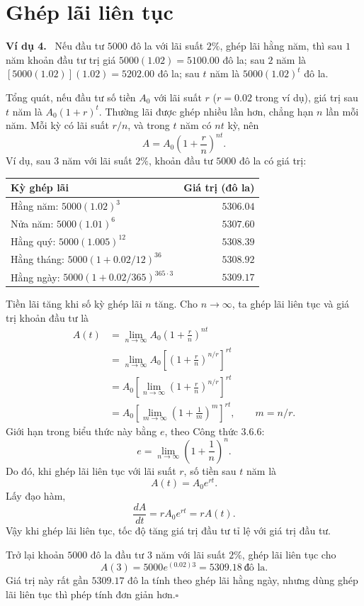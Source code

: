 \documentclass[12pt,a4paper]{article}
\newcommand{\ex}[1]{\par\medskip\noindent\textbf{Ví dụ #1.}\ }
\begin{document}
\section*{Ghép lãi liên tục}
\ex{4} Nếu đầu tư $5000$ đô la với lãi suất $2\%$, ghép lãi hằng năm, thì sau $1$ năm khoản đầu tư trị giá $5000(1.02)=5100.00$ đô la; sau $2$ năm là $[5000(1.02)](1.02)=5202.00$ đô la; sau $t$ năm là $5000(1.02)^t$ đô la.

Tổng quát, nếu đầu tư số tiền $A_0$ với lãi suất $r$ ($r=0.02$ trong ví dụ), giá trị sau $t$ năm là $A_0(1+r)^t$. Thường lãi được ghép nhiều lần hơn, chẳng hạn $n$ lần mỗi năm. Mỗi kỳ có lãi suất $r/n$, và trong $t$ năm có $nt$ kỳ, nên
\[A=A_0\left(1+\frac rn\right)^{nt}.\]
Ví dụ, sau $3$ năm với lãi suất $2\%$, khoản đầu tư $5000$ đô la có giá trị:
\begin{center}\begin{tabular}{lr}\toprule
Kỳ ghép lãi & Giá trị (đô la)\\\midrule
Hằng năm: $5000(1.02)^3$ & $5306.04$\\
Nửa năm: $5000(1.01)^6$ & $5307.60$\\
Hằng quý: $5000(1.005)^{12}$ & $5308.39$\\
Hằng tháng: $5000(1+0.02/12)^{36}$ & $5308.92$\\
Hằng ngày: $5000(1+0.02/365)^{365\cdot3}$ & $5309.17$\\\bottomrule
\end{tabular}\end{center}
Tiền lãi tăng khi số kỳ ghép lãi $n$ tăng. Cho $n\to\infty$, ta ghép lãi liên tục và giá trị khoản đầu tư là
\begin{align*}
A(t)&=\lim_{n\to\infty}A_0\left(1+\frac rn\right)^{nt}\\
&=\lim_{n\to\infty}A_0\left[\left(1+\frac rn\right)^{n/r}\right]^{rt}\\
&=A_0\left[\lim_{n\to\infty}\left(1+\frac rn\right)^{n/r}\right]^{rt}\\
&=A_0\left[\lim_{m\to\infty}\left(1+\frac1m\right)^m\right]^{rt},\qquad m=n/r.
\end{align*}
Giới hạn trong biểu thức này bằng $e$, theo Công thức 3.6.6:
\[e=\lim_{n\to\infty}\left(1+\frac1n\right)^n.\]
Do đó, khi ghép lãi liên tục với lãi suất $r$, số tiền sau $t$ năm là
\[A(t)=A_0e^{rt}.\]
Lấy đạo hàm,
\[\frac{dA}{dt}=rA_0e^{rt}=rA(t).\]
Vậy khi ghép lãi liên tục, tốc độ tăng giá trị đầu tư tỉ lệ với giá trị đầu tư.

Trở lại khoản $5000$ đô la đầu tư $3$ năm với lãi suất $2\%$, ghép lãi liên tục cho
\[A(3)=5000e^{(0.02)3}=5309.18\ \text{đô la}.\]
Giá trị này rất gần $5309.17$ đô la tính theo ghép lãi hằng ngày, nhưng dùng ghép lãi liên tục thì phép tính đơn giản hơn.\hfill$\square$
\end{document}
